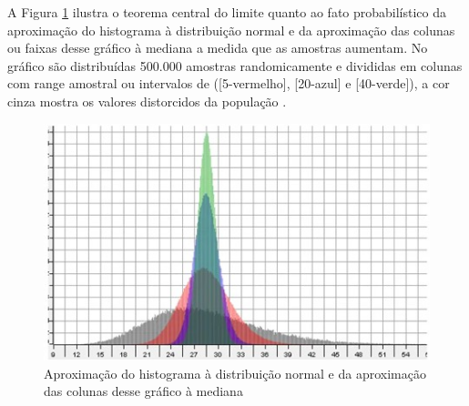 A Figura \ref{fig:statisticsbyjim_central_limit_theorem} ilustra o teorema central do limite quanto ao fato probabilístico da aproximação do histograma à distribuição normal e da aproximação das colunas ou faixas desse gráfico à mediana a medida que as amostras aumentam. No gráfico são distribuídas 500.000 amostras randomicamente e divididas em colunas com range amostral ou intervalos de ([5-vermelho], [20-azul] e [40-verde]), a cor cinza mostra os valores distorcidos da população \cite{statisticsbyjim_central_limite_theorem_explainded}.
	\begin{figure}[H]
	\caption{Aproximação do histograma à distribuição normal e da aproximação das colunas desse gráfico à mediana}
	\label{fig:statisticsbyjim_central_limit_theorem}
	\centering
	\includegraphics[scale=1.2]{sections/images/statisticsbyjim_central_limit_theorem.jpg}
	\end{figure}

